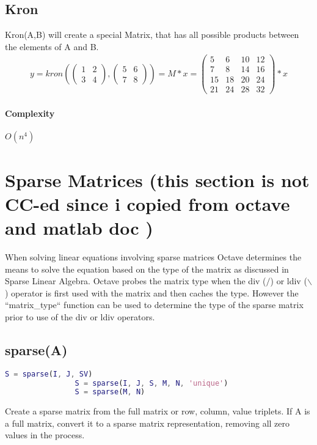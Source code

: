\documentclass[a4paper]{scrartcl}
\begin{document}
	\subsection{Kron} 
		Kron(A,B) will create a special Matrix, that has all possible products between the elements of A and B.
		\begin{align*}
		y = kron\left( \begin{pmatrix}
						1 & 2\\
						3 & 4
						\end{pmatrix}, \begin{pmatrix}
										5 & 6 \\
										7 & 8 
										\end{pmatrix} \right) =
			M \ast x = \begin{pmatrix} 5 &   6 &  10 &  12\\
										7 &   8 &  14 &  16\\
										15 &  18 &  20 &  24\\
										21 &  24 &  28 &  32
						\end{pmatrix} \ast x
		\end{align*}
		\paragraph{Complexity} $O(n^4)$
\section{Sparse Matrices (this section is not CC-ed since i copied from octave and matlab doc )}
			When solving linear equations involving sparse matrices Octave
			determines the means to solve the equation based on the type of the
			matrix as discussed in Sparse Linear Algebra.  Octave probes the
			matrix type when the div ($/$) or ldiv ($\backslash$) operator is first used with
			the matrix and then caches the type.  However the ``matrix\_type``
			function can be used to determine the type of the sparse matrix prior
			to use of the div or ldiv operators.

	\subsection{sparse(A)}
			\begin{lstlisting}[language=matlab]
				S = sparse(I, J, SV)
				S = sparse(I, J, S, M, N, 'unique')
				S = sparse(M, N)
			\end{lstlisting}
			Create a sparse matrix from the full matrix or row, column, value
			triplets.  If A is a full matrix, convert it to a sparse matrix
			representation, removing all zero values in the process.
\end{document}
